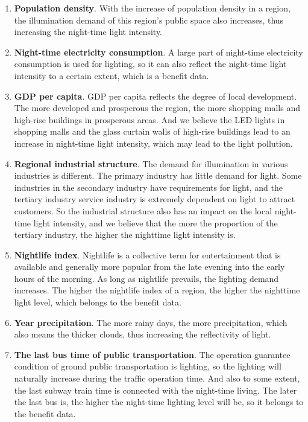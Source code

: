 \begin{enumerate}
    \item \textbf{Population density}. With the increase of population density in a region, the illumination demand of this region's public space also increases, thus increasing the night-time light intensity.
 
    \item \textbf{Night-time electricity consumption}. A large part of night-time electricity consumption is used for lighting, so it can also reflect the night-time light intensity to a certain extent, which is a benefit data. 
     
    \item \textbf{GDP per capita}. GDP per capita reflects the degree of local development. The more developed and prosperous the region, the more shopping malls and high-rise buildings in prosperous areas. And we believe the LED lights in shopping malls and the glass curtain walls of high-rise buildings lead to an increase in night-time light intensity, which may lead to the light pollution.
     
    \item \textbf{Regional industrial structure}. The demand for illumination in various industries is different. The primary industry has little demand for light. Some industries in the secondary industry have requirements for light, and the tertiary industry service industry is extremely dependent on light to attract customers. So the industrial structure also has an impact on the local night-time light intensity, and we believe that the more the proportion of the tertiary industry, the higher the nighttime light intensity is. 
     
    \item \textbf{Nightlife index}. Nightlife is a collective term for entertainment that is available and generally more popular from the late evening into the early hours of the morning. As long as nightlife prevails, the lighting demand increases. The higher the nightlife index of a region, the higher the nighttime light level, which belongs to the benefit data.
    
    \item \textbf{Year precipitation}. The more rainy days, the more precipitation, which also means the thicker clouds, thus increasing the reflectivity of light. 

    \item \textbf{The last bus time of public transportation}. The operation guarantee condition of ground public transportation is lighting, so the lighting will naturally increase during the traffic operation time. And also to some extent, the last subway train time is connected with the night-time living. The later the last bus is, the higher the night-time lighting level will be, so it belongs to the benefit data.
    
\end{enumerate}

